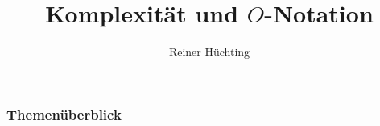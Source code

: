 

\title{Komplexität und $O$-Notation}
\author{Reiner Hüchting}


    \begin{frame}
        \titlepage
    \end{frame}

    \begin{frame}
        \frametitle{Themenüberblick}
        \tableofcontents[hideallsubsections]
    \end{frame}

